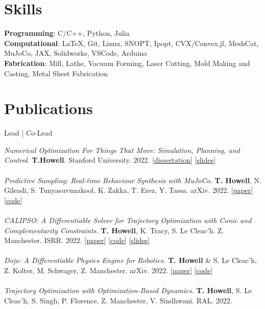 \documentclass[10pt]{article}
\begin{document}
\section*{Skills}
\textbf{Programming}: {\color{lightgray} C/C++, Python, Julia}
\\
\textbf{Computational}: {\color{lightgray} \LaTeX, Git, Linux, SNOPT, Ipopt, CVX/Convex.jl, MeshCat, MuJoCo, JAX, Solidworks, VSCode, Arduino}
\\
\textbf{Fabrication}: {\color{lightgray} Mill, Lathe, Vacuum Forming, Laser Cutting, Mold Making and Casting, Metal Sheet Fabrication}

\section*{Publications}
\begin{center} Lead | Co-Lead \end{center}
\textit{Numerical Optimization For Things That Move: Simulation, Planning, and Control}. \textbf{T.Howell}. {\color{lightgray} Stanford University. 2022.}
[\href{https://github.com/thowell/thesis/blob/main/main.pdf}{dissertation}]
[\href{https://docs.google.com/presentation/d/1ypalKNcd1hAI59Fur3mFP5FYANqrQ1Smk2gUb-UiBIA/edit?usp=sharing}{slides}]
\\
\\
\textit{Predictive Sampling: Real-time Behaviour Synthesis with MuJoCo}. \textbf{T. Howell}{\color{lightgray}, N. Gileadi, S. Tunyasuvunakool, K. Zakka, T. Erez, Y. Tassa. arXiv. 2022.}
[\href{https://arxiv.org/abs/2212.00541}{paper}]
[\href{https://github.com/deepmind/mujoco_mpc}{code}]
\\
\\
\textit{CALIPSO: A Differentiable Solver for Trajectory Optimization with Conic and Complementarity Constraints.} \textbf{T. Howell}{\color{lightgray}, K. Tracy, S. Le Cleac'h. Z. Manchester. ISRR. 2022.}
[\href{https://arxiv.org/abs/2205.09255}{paper}]
[\href{https://github.com/thowell/CALIPSO.jl}{code}]
[\href{https://slides.com/taylorhowell/calipso}{slides}]
\\
\\
\textit{Dojo: A Differentiable Physics Engine for Robotics.} \textbf{T. Howell} {\color{lightgray}\& S. Le Cleac'h, Z. Kolter, M. Schwager, Z. Manchester. arXiv. 2022.}
[\href{https://arxiv.org/abs/2203.00806}{paper}]
[\href{https://github.com/dojo-sim}{code}]
\\
\\
\textit{Trajectory Optimization with Optimization-Based Dynamics.} \textbf{T. Howell}{\color{lightgray}, S. Le Cleac'h, S. Singh, P. Florence, Z. Manchester, V. Sindhwani. RAL. 2022.}
\end{document}
